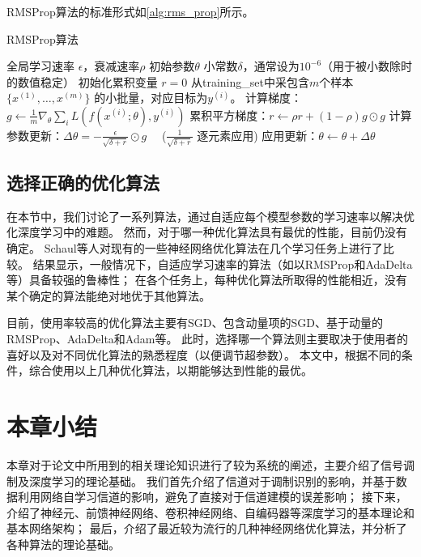 RMSProp算法的标准形式如\ref{alg:rms_prop}所示。
\begin{algorithm}[ht]
	\caption{RMSProp算法}
	\label{alg:rms_prop}
	\begin{algorithmic}
		\REQUIRE 全局学习速率 $\epsilon$，衰减速率$\rho$
		\REQUIRE  初始参数$\theta$
		\REQUIRE 小常数$\delta$，通常设为$10^{-6}$（用于被小数除时的数值稳定）
		\STATE 初始化累积变量 $r = 0$
		\STATE 从\gls{training_set}中采包含$m$个样本$\{ x^{(1)},\dots, x^{(m)}\}$ 的小批量，对应目标为$y^{(i)}$。
		\STATE 计算梯度：$g \leftarrow  
		\frac{1}{m} \nabla_{\theta} \sum_i L(f(x^{(i)};\theta),y^{(i)})$ 
		\STATE 累积平方梯度：$r \leftarrow \rho
		r + (1-\rho) g \odot g$
		\STATE 计算参数更新：$\Delta \theta =
		-\frac{\epsilon}{\sqrt{\delta + r}} \odot g$  \ \  ($\frac{1}{\sqrt{\delta + r}}$ 逐元素应用)
		\STATE 应用更新：$\theta \leftarrow \theta + \Delta \theta$
		\ENDWHILE
	\end{algorithmic}
\end{algorithm}

\subsection{选择正确的优化算法}
\label{sec:choosing_the_right_optimization_algorithms}
在本节中，我们讨论了一系列算法，通过自适应每个模型参数的学习速率以解决优化深度学习中的难题。
然而，对于哪一种优化算法具有最优的性能，目前仍没有确定。
Schaul等人对现有的一些神经网络优化算法在几个学习任务上进行了比较\cite{schaul2013unit}。
结果显示，一般情况下，自适应学习速率的算法（如以RMSProp和AdaDelta等）具备较强的鲁棒性；
在各个任务上，每种优化算法所取得的性能相近，没有某个确定的算法能绝对地优于其他算法。\par

目前，使用率较高的优化算法主要有SGD、包含动量项的SGD、基于动量的RMSProp、AdaDelta和Adam等。
此时，选择哪一个算法则主要取决于使用者的喜好以及对不同优化算法的熟悉程度（以便调节超参数）。
本文中，根据不同的条件，综合使用以上几种优化算法，以期能够达到性能的最优。

\section{本章小结}
本章对于论文中所用到的相关理论知识进行了较为系统的阐述，主要介绍了信号调制及深度学习的理论基础。
我们首先介绍了信道对于调制识别的影响，并基于数据利用网络自学习信道的影响，避免了直接对于信道建模的误差影响；
接下来，介绍了神经元、前馈神经网络、卷积神经网络、自编码器等深度学习的基本理论和基本网络架构；
最后，介绍了最近较为流行的几种神经网络优化算法，并分析了各种算法的理论基础。
